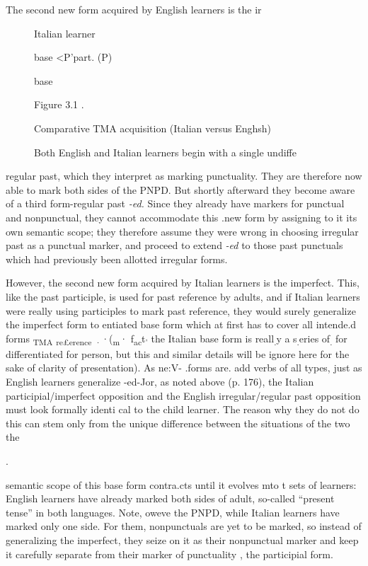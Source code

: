 The second new form acquired by English learners is the ir\-%
\begin{figure}
Italian learner

base {\textless}P{\textquotedbl}'part. (P)

base

Figure 3.1 .

Comparative TMA acquisition (Italian versus Enghsh)

Both English and Italian learners begin with a single undiffe
\end{figure}%
%
regular past, which they interpret as marking punctuality. They are therefore now able to mark both sides of the PNPD. But shortly after\-ward they become aware of a third form-regular past \textit{{}-ed.} Since they already have markers for punctual and nonpunctual, they cannot ac\-commodate this .new form by assigning to it its own semantic scope; they therefore assume they were wrong in choosing irregular past as a punctual marker, and proceed to extend \textit{{}-ed} to those past punc\-tuals which had previously been allotted irregular forms.

However, the second new form acquired by Italian learners
is the imperfect. This, like the past participle, is used for past reference by adults, and if Italian learners were really using participles to mark past reference, they would surely generalize the imperfect form to
entiated base form which at first has to cover all intende.d forms \textsubscript{TMA}\textsubscript{ }\textsubscript{r}\textsubscript{e}\textsubscript{£}\textsubscript{erence}\textsubscript{ }\textsubscript{·}·(\textsubscript{m}· f\textsubscript{a}\textsubscript{c}t\textsubscript{'}\textsubscript{ }the Italian base form is reall\textsubscript{.}y a s\textsubscript{.}eries of\textsubscript{.}\textsubscript{ }for differentiated for person, but this and similar details will be ignore
here for the sake of clarity of presentation). As ne:V- .forms are. add
verbs of all types, just as English learners generalize {}-ed-Jor, as noted
above (p. 176), the Italian participial/imperfect opposition and the
English irregular/regular past opposition must look formally identi\-
cal to the child learner. The reason why they do not do this can stem only from the unique difference between the situations of the two the

.

semantic scope of this base form contra.cts until it evolves mto t
sets of learners: English learners have already marked both sides of
adult, so-called ``present tense'' in both languages. Note, oweve 
the PNPD, while Italian learners have marked only one side. For them, nonpunctuals are yet to be marked, so instead of generalizing the imperfect, they seize on it as their nonpunctual marker and keep it carefully separate from their marker of punctuality , the participial form.

